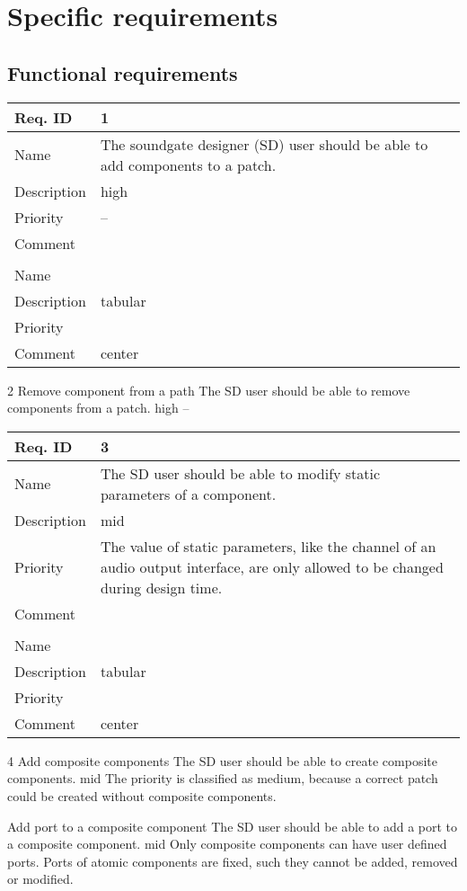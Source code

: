 \chapter{Specific requirements}

\newcommand{\funcRequirement}[6]{
\begin{center}
\begin{tabular}{|l|p{12cm}|}
\hline
Req. ID 		& #1 \\ \hline
Name 				& #3 \\ \hline
Description & #4 \\ \hline
Priority 		& #5 \\ \hline
Comment 		& #6 \\ \hline
\end{tabular}
\end{center}
}


	\section{Functional requirements}
	

	\funcRequirement{1}
	{Add component to a patch}
	{The soundgate designer (SD) user should be able to add components to a patch.}
	{high}
	{--}
	
  \funcRequirement{2}
	{Remove component from a path}
	{The SD user should be able to remove components from a patch.}
	{high}
	{--}
	
  \funcRequirement{3}
	{Modify attributes of a component}
	{The SD user should be able to modify static parameters of a component.}
	{mid}
	{The value of static parameters, like the channel of an audio output interface, are only allowed to be changed during design time.}
	
	\funcRequirement{4}
	{Add composite components}
	{The SD user should be able to create composite components.}
	{mid}
	{The priority is classified as medium, because a correct patch could be created without composite components. }
	
	{Add port to a composite component}
	{The SD user should be able to add a port to a composite component.}
	{mid}
	{Only composite components can have user defined ports. Ports of atomic components are fixed, such they cannot be added, removed or modified.}
	
